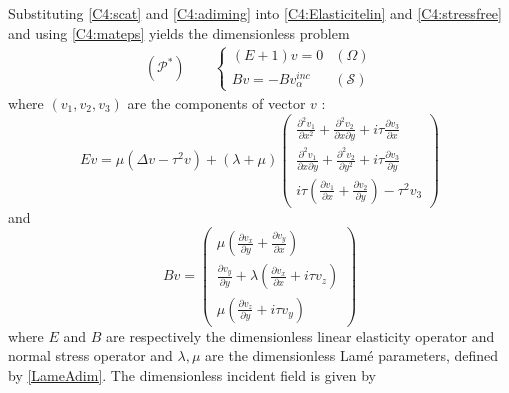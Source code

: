Substituting \eqref{C4:scat} and \eqref{C4:adiming} into \eqref{C4:Elasticitelin} and \eqref{C4:stressfree} and using \eqref{C4:mateps} yields the dimensionless problem
\begin{eqnarray}
(\mathcal{P}^*) \hspace{2em} \left\{
\begin{array}{lr}
(E+1)v=0 & (\Omega) \\
Bv=-Bv_{\alpha}^{inc} & (\mathcal{S})
\end{array}
\right.
\label{C4:Padim}
\end{eqnarray}
where $(v_1,v_2,v_3)$ are the components of vector $v$ :
\begin{equation}
Ev=\mu (\Delta v -\tau^2 v)+(\lambda+\mu)
\begin{pmatrix}
\frac{\partial^2 v_1}{\partial x^2}+\frac{\partial^2 v_2}{\partial x \partial y} + i\tau\frac{\partial v_3}{\partial x} \\
\frac{\partial^2 v_1}{\partial x \partial y}+\frac{\partial^2 v_2}{\partial y^2}+ i\tau\frac{\partial v_3}{\partial y}\\
i\tau\left( \frac{\partial v_1}{\partial x}+\frac{\partial v_2}{\partial y}\right)-\tau^2 v_3
\end{pmatrix}
\label{C4:Eadim}
\end{equation}
and
\begin{equation}
Bv=\begin{pmatrix}
\mu \left(\frac{\partial v_x}{\partial y}+\frac{\partial v_y}{\partial x}\right) \\
\frac{\partial v_y}{\partial y}+\lambda\left( \frac{\partial v_x}{\partial x}+i\tau v_z\right)\\
\mu \left(\frac{\partial v_z}{\partial y}+i\tau v_y\right)
\end{pmatrix}
\label{C4:Badim}
\end{equation}
where $E$ and $B$ are respectively the dimensionless linear elasticity operator and normal stress operator and $\lambda,\mu$ are the dimensionless Lamé parameters, defined by \eqref{LameAdim}. The dimensionless incident field is given by
